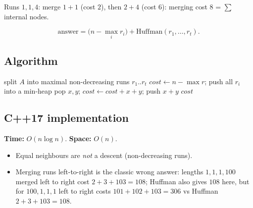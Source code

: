 \begin{center}
\qquad
\begin{minipage}{6.5cm}\small
Runs $1,1,4$: merge $1+1$ (cost $2$), then $2+4$ (cost $6$): merging
cost $8$ = $\sum$ internal nodes.
\end{minipage}
\end{center}

\begin{ideabox}
\[
  \text{answer}=\bigl(n-\max_i r_i\bigr)+\text{Huffman}(r_1,\dots,r_t).
\]
\end{ideabox}

\subsection*{Algorithm}
\begin{algorithmic}[1]
\State split $A$ into maximal non-decreasing runs $r_1..r_t$
\State $cost\gets n-\max r$; push all $r_i$ into a min-heap
 \State pop $x,y$; $cost\gets cost+x+y$; push $x+y$ \EndWhile
\State \Return $cost$
\end{algorithmic}


\subsection*{C++17 implementation}

\begin{complexitybox}
\textbf{Time:} $O(n\log n)$. \textbf{Space:} $O(n)$.
\end{complexitybox}

\begin{pitfallbox}
\begin{itemize}
  \item Equal neighbours are \emph{not} a descent (non-decreasing runs).
  \item Merging runs left-to-right is the classic wrong answer: lengths
        $1,1,1,100$ merged left to right cost $2+3+103=108$; Huffman also
        gives $108$ here, but for $100,1,1,1$ left to right costs
        $101+102+103=306$ vs Huffman $2+3+103=108$.
\end{itemize}
\end{pitfallbox}
